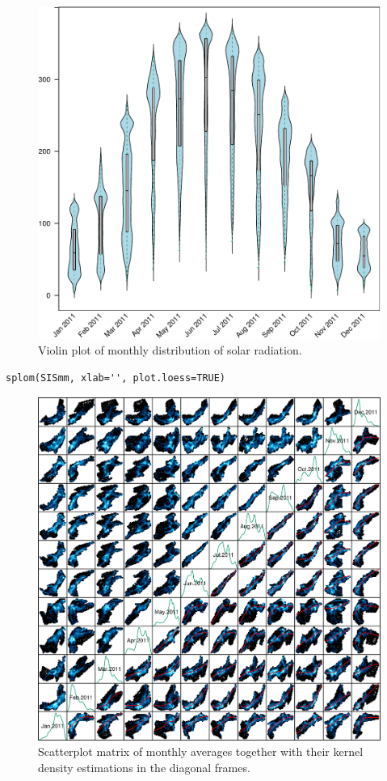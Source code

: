 \begin{figure}[htb]
\centering
\includegraphics[width=.9\linewidth]{figs/SISdm_boxplot.pdf}
\caption{\label{fig:SISdm_boxplot}Violin plot of monthly distribution of solar radiation.}
\end{figure}


\lstset{language=R,numbers=none}
\begin{lstlisting}
splom(SISmm, xlab='', plot.loess=TRUE)
\end{lstlisting}

\begin{figure}[htb]
\centering
\includegraphics[width=.9\linewidth]{figs/SISmm_splom.png}
\caption{\label{fig:SISmm_splom}Scatterplot matrix of monthly averages together with their kernel density estimations in the diagonal frames.}
\end{figure}


